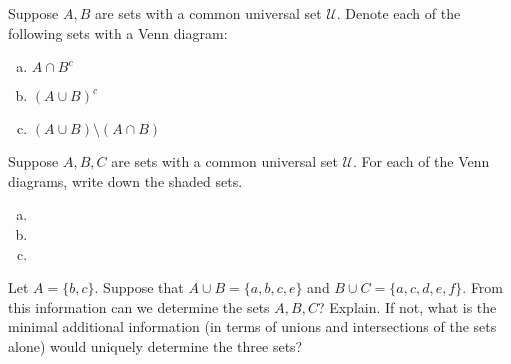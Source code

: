 \documentclass[11pt,letterpaper]{article}
\begin{document}
\newpage





 Suppose $A, B$ are sets with a common universal set $\mathscr{U}$. Denote each of the following sets with a Venn diagram: 
	\begin{enumerate}[(a)]
	\item $A \cap B^c$
	\item $(A \cup B)^c$
	\item $(A \cup B) \setminus (A \cap B)$
	\end{enumerate}





\newpage





 Suppose $A, B, C$ are sets with a common universal set $\mathscr{U}$. For each of the Venn diagrams, write down the shaded sets.  
	\begin{enumerate}[(a)]
	\item \diagramOne
	\item \diagramTwo
	\item \diagramThree
	\end{enumerate}





\newpage





 Let $A= \{ b, c \}$. Suppose that $A \cup B= \{ a, b, c, e \}$ and $B \cup C= \{ a, c, d, e, f \}$. From this information can we determine the sets $A, B, C$? Explain. If not, what is the minimal additional information (in terms of unions and intersections of the sets alone) would uniquely determine the three sets? \pspace
\end{document}
